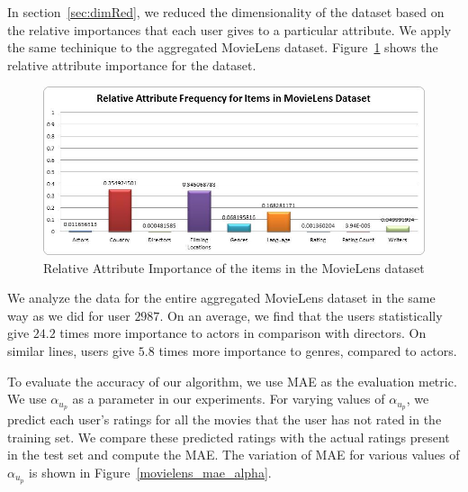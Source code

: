 \documentclass{acm_proc_article-sp}
\begin{document}
In section~\ref{sec:dimRed}, we reduced the dimensionality of the dataset based on the relative importances that each user gives to a particular attribute. We apply the same techinique to the aggregated MovieLens dataset. Figure~\ref{movielens_attrRelFreq_item} shows the relative attribute importance for the dataset.

\begin{figure}[htp]
\centering
\includegraphics[scale=0.38]{Results/movielens_attrRelFreq_item.jpg}
\caption{Relative Attribute Importance of the items in the MovieLens dataset}
\label{movielens_attrRelFreq_item}
\end{figure}

We analyze the data for the entire aggregated MovieLens dataset in the same way as we did for user $2987$. On an average, we find that the users statistically give $24.2$ times more importance to actors in comparison with directors. On similar lines, users give $5.8$ times more importance to genres, compared to actors.



To evaluate the accuracy of our algorithm, we use MAE as the evaluation metric. We use $\alpha_{u_p}$ as a parameter in our experiments. For varying values of $\alpha_{u_p}$, we predict each user's ratings for all the movies that the user has not rated in the training set. We compare these predicted ratings with the actual ratings present in the test set and compute the MAE. The variation of MAE for various values of $\alpha_{u_p}$ is shown in Figure~\ref{movielens_mae_alpha}.
\end{document}
